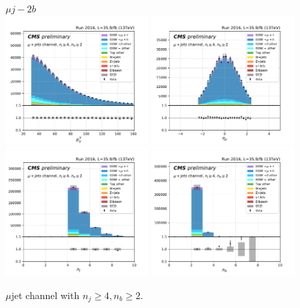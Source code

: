 \begin{figure}[ht]
    \centering
    $\mu j - 2b$ \\
    \includegraphics[width=0.49\textwidth]{chapters/Analysis/sectionPlots/figures/kinematics_pickles/mu4j/2b/mu4j_2b_lepton1_pt.pdf}
    \includegraphics[width=0.49\textwidth]{chapters/Analysis/sectionPlots/figures/kinematics_pickles/mu4j/2b/mu4j_2b_lepton1_eta.pdf}
    \includegraphics[width=0.49\textwidth]{chapters/Analysis/sectionPlots/figures/kinematics_pickles/mu4j/2b/mu4j_2b_nJets.pdf}
    \includegraphics[width=0.49\textwidth]{chapters/Analysis/sectionPlots/figures/kinematics_pickles/mu4j/2b/mu4j_2b_nBJets.pdf}
    
    \caption{$\mu$jet channel with $n_j\geq4, n_b\geq2$.}
\end{figure}

